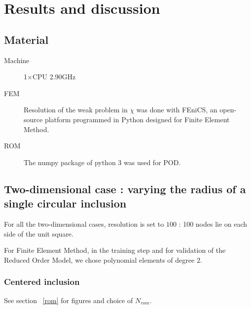 \section{Results and discussion}\label{res}

\subsection{Material}

\begin{description}
\item [Machine] 1$\times$CPU 2.90GHz
\item [FEM] Resolution of the weak problem in $\chi$ was done with FEniCS, %
an open-source platform programmed in Python designed for Finite Element Method.
\item [ROM] The numpy package of python 3 was used for POD.
\end{description}

\subsection{Two-dimensional case : varying the radius of a single circular inclusion}

For all the two-dimensional cases, resolution is set to $100$ : %
100 nodes lie on each side of the unit square.

\par
For Finite Element Method, in the training step and for validation of the Reduced Order Model, we chose polynomial elements of degree $2$.

\subsubsection{Centered inclusion}

See section \ \ref{rom} for figures and choice of $N_{rom}$.
\begin{comment}
\begin{figure}[H]%
%
\begin{center}
\begin{tabular}{|c|c||c|c||c|c||c|c||c||c|}
\hline
$\rho^{new}$&Porosity&${D_k^{hom,ROM}}_{11}$&${D_k^{hom,FEM}}_{11}$&$Err$&$\phi_i^{new}$&ROM&FEM&Nodes\\
\hline
0,22&0,8479&0,73607&0,73606&0,001\%&14.9s&0.8s&22.5s&202432\\
\hline
0,33&0,6579&0,4880&0,4887&0,006\%&11.8s&0.8s&13.3s&157456\\
\hline
0,44&0,3918&0,2238&0,2235&0,114\%&8.5s&0.7s&4.8s&92866\\
\hline
\end{tabular}
\end{center}
\caption{$N_{rom}=5$}
%
\end{figure}

\end{comment}
